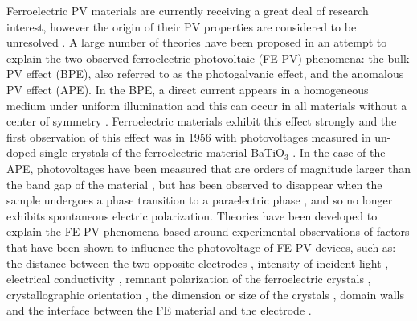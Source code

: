 Ferroelectric PV materials are currently receiving a great deal of research interest, however the origin of their PV properties are considered to be unresolved \cite{Rappe}. A large number of theories have been proposed in an attempt to explain the two observed ferroelectric-photovoltaic (FE-PV) phenomena: the bulk PV effect (BPE), also referred to as the photogalvanic effect, and the anomalous PV effect (APE). In the BPE, a direct current appears in a homogeneous medium under uniform illumination and this can occur in all materials without a center of symmetry  \cite{PGE}. Ferroelectric materials exhibit this effect strongly \cite{Rappe} and the first observation of this effect was in 1956 with photovoltages measured in un-doped single crystals of the ferroelectric material BaTiO$_3$ \cite{keith_46}. In the case of the APE, photovoltages have been measured that are orders of magnitude larger than the band gap of the material \cite{keith_54}, but has been observed to disappear when the sample undergoes a phase transition to a paraelectric phase \cite{nonlinear_dielectric}, and so no longer exhibits spontaneous electric polarization. Theories have been developed to explain the FE-PV phenomena based around experimental observations of factors that have been shown to influence the photovoltage of FE-PV devices, such as:  the distance between the two opposite electrodes \cite{rev_28,rev_46}, intensity of incident light \cite{rev_47}, electrical conductivity \cite{Fridkin}, remnant polarization of the
ferroelectric crystals \cite{rev_48}, crystallographic orientation \cite{rev_49}, the dimension or size of the crystals \cite{rev_46, rev_50}, domain walls \cite{rev_30}
and the interface between the FE material and the electrode \cite{rev_37}.\\

